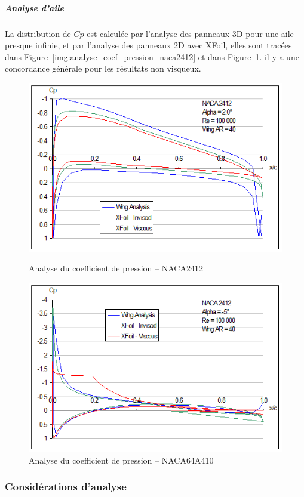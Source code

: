 \documentclass[a4paper,twoside,12pt,dvips]{article}
\begin{document}
\clearpage

\subparagraph{Analyse d’aile}

La distribution de $Cp$ est calculée par l’analyse des panneaux 3D pour une aile presque infinie, et par l’analyse des panneaux 2D avec XFoil, elles sont tracées dans Figure~\ref{img:analyse_coef_pression_naca2412} et dans 
Figure~\ref{img:analyse_coef_pression_naca64A410}. il y a une concordance générale pour les résultats non visqueux.

\begin{figure}[H]
	\centering
	\begin{subfloat}
		\centering
		\includegraphics[width=0.7\linewidth]{img-23}
		\caption{Analyse du coefficient de pression – NACA2412}
		\label{img:analyse_coef_pression_naca2412}
	\end{subfloat}

	\begin{subfloat}
		\centering 
		\includegraphics[width=0.7\linewidth]{img-24}
		\caption{Analyse du coefficient de pression – NACA64A410}
		\label{img:analyse_coef_pression_naca64A410}
	\end{subfloat}
\end{figure}

\subsubsection{Considérations d’analyse}
\end{document}
